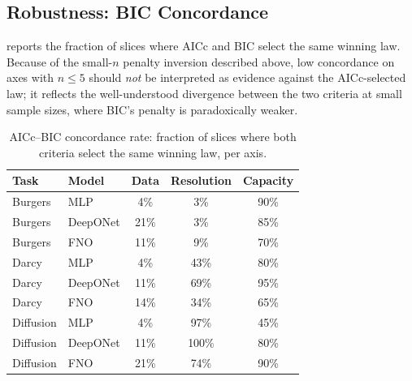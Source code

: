 \documentclass[11pt]{article}
\begin{document}
\subsection{Robustness: BIC Concordance}
\label{app:bic}

 reports the fraction of slices where AICc
and BIC select the same winning law. Because of the small-$n$ penalty
inversion described above, low concordance on axes with $n \leq 5$
should \emph{not} be interpreted as evidence against the AICc-selected
law; it reflects the well-understood divergence between the two
criteria at small sample sizes, where BIC's penalty is paradoxically
weaker.

\begin{table}[h]
\centering
\caption{AICc--BIC concordance rate: fraction of slices where both
criteria select the same winning law, per axis.}
\label{tab:bic-concordance}
\begin{tabular}{@{}llccc@{}}
\toprule
\textbf{Task} & \textbf{Model} & \textbf{Data} & \textbf{Resolution} &
\textbf{Capacity} \\
\midrule
Burgers   & MLP      & 4\%  & 3\%   & 90\% \\
Burgers   & DeepONet & 21\% & 3\%   & 85\% \\
Burgers   & FNO      & 11\% & 9\%   & 70\% \\
Darcy     & MLP      & 4\%  & 43\%  & 80\% \\
Darcy     & DeepONet & 11\% & 69\%  & 95\% \\
Darcy     & FNO      & 14\% & 34\%  & 65\% \\
Diffusion & MLP      & 4\%  & 97\%  & 45\% \\
Diffusion & DeepONet & 11\% & 100\% & 80\% \\
Diffusion & FNO      & 21\% & 74\%  & 90\% \\
\bottomrule
\end{tabular}

\vspace{4pt}
\end{table}
\end{document}
